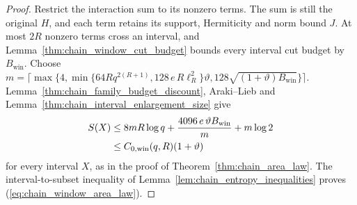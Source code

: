 \begin{proof}
    \leanok
    Restrict the interaction sum to its nonzero terms. The sum is still
    the original $H$, and each term retains its support, Hermiticity
    and norm bound $J$. At most $2R$ nonzero terms cross an interval, and
    Lemma~\ref{thm:chain_window_cut_budget} bounds every interval cut budget
    by $B_{\mathrm{win}}$. Choose
    $m=\lceil\max\{4,\min\{64Rq^{2(R+1)},128\,e\,R\ell_R^2\}\vartheta,
        128\sqrt{(1+\vartheta)B_{\mathrm{win}}}\}\rceil$.
    Lemma~\ref{thm:chain_family_budget_discount}, Araki--Lieb and
    Lemma~\ref{thm:chain_interval_enlargement_size} give
    \begin{align}
        S(X)
         & \le8mR\log q+\frac{4096\,e\,\vartheta B_{\mathrm{win}}}{m}+m\log2\notag \\
         & \le C_{0,\mathrm{win}}(q,R)(1+\vartheta)\notag
    \end{align}
    for every interval $X$, as in the proof of
    Theorem~\ref{thm:chain_area_law}. The interval-to-subset
    inequality of Lemma~\ref{lem:chain_entropy_inequalities} proves
    (\ref{eq:chain_window_area_law}).
\end{proof}

